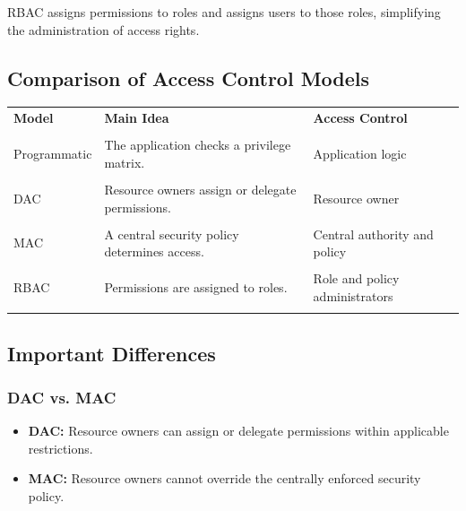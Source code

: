 \documentclass[11pt,a4paper]{article}
\begin{document}
RBAC assigns permissions to roles and assigns users to those roles, simplifying the administration of access rights.

\subsection{Comparison of Access Control Models}

\begin{center}
    \begin{tabular}{|l|p{5.2cm}|p{4.1cm}|}
        \hline
        \textbf{Model} & \textbf{Main Idea}                              & \textbf{Access Control}        \\\\
        \hline
        Programmatic   & The application checks a privilege matrix.      & Application logic              \\\\
        \hline
        DAC            & Resource owners assign or delegate permissions. & Resource owner                 \\\\
        \hline
        MAC            & A central security policy determines access.    & Central authority and policy   \\\\
        \hline
        RBAC           & Permissions are assigned to roles.              & Role and policy administrators \\\\
        \hline
    \end{tabular}
\end{center}

\subsection{Important Differences}

\subsubsection{DAC vs. MAC}

\begin{itemize}
    \item \textbf{DAC:} Resource owners can assign or delegate permissions within applicable restrictions.
    \item \textbf{MAC:} Resource owners cannot override the centrally enforced security policy.
\end{itemize}
\end{document}
